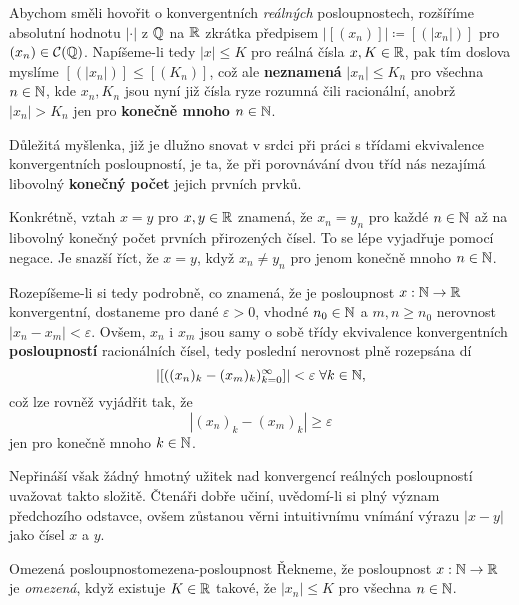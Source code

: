 Abychom směli hovořit o konvergentních \emph{reálných} posloupnostech, rozšíříme
absolutní hodnotu $| \cdot |$ z $\mathbb{Q}$ na $\mathbb{R}$ zkrátka předpisem $|[(x_n)]|
\coloneqq [(|x_n|)]$ pro $(x_n) \in \mathcal{C}(\mathbb{Q})$. Napíšeme-li tedy $|x| \leq
K$ pro reálná čísla $x,K \in \mathbb{R}$, pak tím doslova myslíme $[(|x_n|)] \leq
[(K_n)]$, což ale \textbf{neznamená} $|x_n| \leq K_n$ pro všechna $n \in \mathbb{N}$,
kde $x_n,K_n$ jsou nyní již čísla ryze rozumná čili racionální, anobrž $|x_n| >
K_n$ jen pro \textbf{konečně mnoho} $n \in \mathbb{N}$.

\begin{warning}{}{}
 Důležitá myšlenka, již je dlužno snovat v srdci při práci s třídami ekvivalence
 konvergentních posloupností, je ta, že při porovnávání dvou tříd nás nezajímá
 libovolný \textbf{konečný počet} jejich prvních prvků.

 Konkrétně, vztah $x = y$ pro $x,y \in \mathbb{R}$ znamená, že $x_n = y_n$ pro každé $n
 \in \mathbb{N}$ až na libovolný konečný počet prvních přirozených čísel. To se lépe
 vyjadřuje pomocí negace. Je snazší říct, že $x = y$, když $x_n \neq y_n$ pro
 jenom konečně mnoho $n \in \mathbb{N}$.
\end{warning}

Rozepíšeme-li si tedy podrobně, co znamená, že je posloupnost $x:\mathbb{N} \to \mathbb{R}$
konvergentní, dostaneme pro dané $\varepsilon>0$, vhodné $n_0 \in \mathbb{N}$ a $m,n
\geq n_0$ nerovnost $|x_n - x_m| < \varepsilon$. Ovšem, $x_n$ i $x_m$ jsou samy
o sobě třídy ekvivalence konvergentních \textbf{posloupností} racionálních
čísel, tedy poslední nerovnost plně rozepsána dí
\[
 |[((x_n)_{k} - (x_m)_{k})_{k=0}^{\infty}]| < \varepsilon \; \forall k \in \mathbb{N},
\]
což lze rovněž vyjádřit tak, že
\[
 |(x_n)_k - (x_m)_k| \geq \varepsilon
\]
jen pro konečně mnoho $k \in \mathbb{N}$.

Nepřináší však žádný hmotný užitek nad konvergencí reálných posloupností
uvažovat takto složitě. Čtenáři dobře učiní, uvědomí-li si plný význam
předchozího odstavce, ovšem zůstanou věrni intuitivnímu vnímání výrazu $|x - y|$
jako  čísel $x$ a $y$.

\begin{definition}{Omezená posloupnost}{omezena-posloupnost}
 Řekneme, že posloupnost $x:\mathbb{N} \to \mathbb{R}$ je \emph{omezená}, když existuje $K \in
 \mathbb{R}$ takové, že $|x_n| \leq K$ pro všechna $n \in \mathbb{N}$.
\end{definition}

